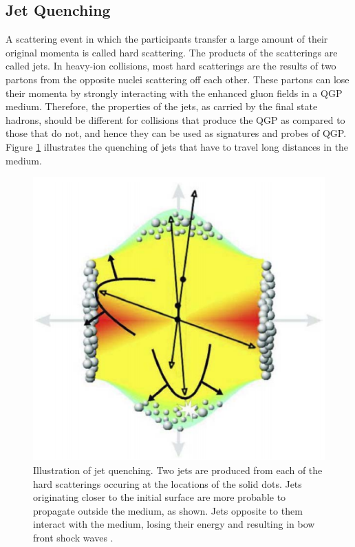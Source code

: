\subsection{Jet Quenching}
A scattering event in which the participants transfer a large amount of their original momenta is called hard scattering. The products of the scatterings are called jets. %
In heavy-ion collisions, most hard scatterings are the results of two partons from the opposite nuclei scattering off each other. These partons can lose their momenta by strongly interacting with the enhanced gluon fields in a QGP medium. Therefore, the properties of the jets, as carried by the final state hadrons, should be different for collisions that produce the QGP as compared to those that do not, and hence they can be used as signatures and probes of QGP. Figure \ref{fig:jets} illustrates the quenching of jets that have to travel long distances in the medium. %
	\begin{figure}[h]
	  \centering
	  \includegraphics[width=4.5in]{figures/jets.PNG}
	  \caption{Illustration of jet quenching. Two jets are produced from each of the hard scatterings occuring at the locations of the solid dots. Jets originating closer to the initial surface are more probable to propagate outside the medium, as shown. Jets opposite to them interact with the medium, losing their energy and resulting in bow front shock waves \cite{STOCKER2005121}.}\label{fig:jets}
	\end{figure}
	

